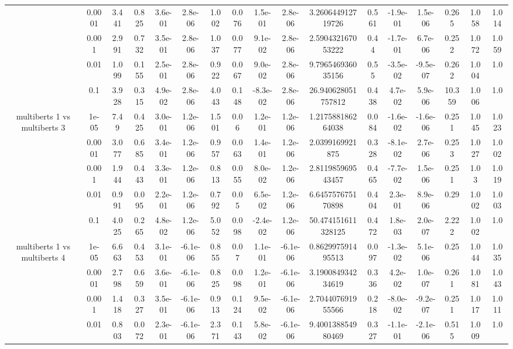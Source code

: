 \begin{tabular}{|c|c|c|c|c|c|c|c|c|c|c|c|c|c|c|c|c|}
 & 0.0001 & 3.441 & 0.825 & 3.6e-01 & 2.8e-06 & 1.002 & 0.076 & 1.5e-01 & 2.8e-06 & 3.260644912719726 & 0.561 & -1.9e-01 & 1.5e-06 & 0.265 & 1.058 & 1.014 \\
 & 0.001 & 2.991 & 0.732 & 3.5e-01 & 2.8e-06 & 1.037 & 0.077 & 9.1e-02 & 2.8e-06 & 2.590432167053222 & 0.44 & -1.7e-01 & 6.7e-06 & 0.252 & 1.072 & 1.059 \\
 & 0.01 & 1.099 & 0.155 & 2.5e-01 & 2.8e-06 & 0.922 & 0.067 & 9.0e-02 & 2.8e-06 & 9.796546936035156 & 0.55 & -3.5e-02 & -9.5e-07 & 0.262 & 1.004 & 1.0 \\
 & 0.1 & 3.928 & 0.315 & 4.9e-02 & 2.8e-06 & 4.043 & 0.148 & -8.3e-02 & 2.8e-06 & 26.940628051757812 & 0.438 & 4.7e-02 & 5.9e-06 & 10.359 & 1.006 & 1.0 \\
\hline
\multirow{5}{*}{multiberts 1 vs multiberts 3} & 1e-05 & 7.49 & 0.425 & 3.0e-01 & 1.2e-06 & 1.501 & 0.06 & 1.2e-01 & 1.2e-06 & 1.217588186264038 & 0.084 & -1.6e-02 & -1.6e-06 & 0.251 & 1.045 & 1.023 \\
 & 0.0001 & 3.077 & 0.685 & 3.4e-01 & 1.2e-06 & 0.957 & 0.063 & 1.4e-01 & 1.2e-06 & 2.0399169921875 & 0.328 & -8.1e-02 & 2.7e-06 & 0.253 & 1.027 & 1.002 \\
 & 0.001 & 1.944 & 0.443 & 3.3e-01 & 1.2e-06 & 0.813 & 0.055 & 8.0e-02 & 1.2e-06 & 2.811985969543457 & 0.465 & -7.7e-02 & 1.5e-06 & 0.251 & 1.03 & 1.019 \\
 & 0.01 & 0.991 & 0.095 & 2.2e-01 & 1.2e-06 & 0.792 & 0.05 & 6.5e-02 & 1.2e-06 & 6.645757675170898 & 0.404 & 2.3e-01 & 8.9e-06 & 0.29 & 1.002 & 1.003 \\
 & 0.1 & 4.025 & 0.265 & 4.8e-02 & 1.2e-06 & 5.052 & 0.098 & -2.4e-02 & 1.2e-06 & 50.474151611328125 & 0.472 & 1.8e-03 & 2.0e-07 & 2.222 & 1.002 & 1.0 \\
\hline
\multirow{5}{*}{multiberts 1 vs multiberts 4} & 1e-05 & 6.663 & 0.453 & 3.1e-01 & -6.1e-06 & 0.855 & 0.07 & 1.1e-01 & -6.1e-06 & 0.862997591495513 & 0.097 & -1.3e-02 & 5.1e-06 & 0.25 & 1.044 & 1.035 \\
 & 0.0001 & 2.798 & 0.659 & 3.6e-01 & -6.1e-06 & 0.825 & 0.098 & 1.2e-01 & -6.1e-06 & 3.190084934234619 & 0.336 & 4.2e-02 & 1.0e-07 & 0.261 & 1.081 & 1.043 \\
 & 0.001 & 1.418 & 0.327 & 3.5e-01 & -6.1e-06 & 0.913 & 0.124 & 9.5e-02 & -6.1e-06 & 2.704407691955566 & 0.218 & -8.0e-02 & -9.2e-07 & 0.251 & 1.017 & 1.011 \\
 & 0.01 & 0.803 & 0.072 & 2.3e-01 & -6.1e-06 & 2.371 & 0.143 & 5.8e-02 & -6.1e-06 & 9.400138854980469 & 0.327 & -1.1e-01 & -2.1e-06 & 0.515 & 1.009 & 1.0 \\

\end{tabular}
